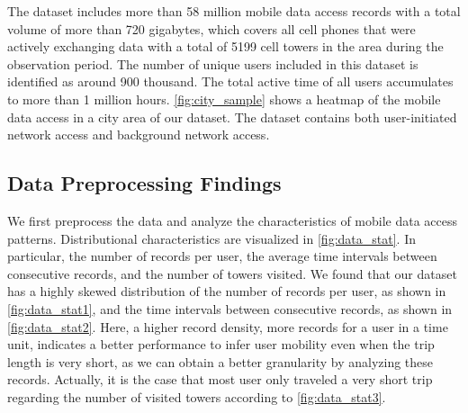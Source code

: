 

The dataset includes more than 58 million mobile data access records with a total volume of more than 720 gigabytes, which covers all cell phones that were actively exchanging data with a total of 5199 cell towers in the area during the observation period.
The number of unique users included in this dataset is identified as around 900 thousand. %
The total active time of all users accumulates to more than 1 million hours.
\autoref{fig:city_sample} shows a heatmap of the mobile data access in a city area of our dataset.
The dataset contains both user-initiated network access and background network access.

\subsection{Data Preprocessing Findings}

We first preprocess the data and analyze the characteristics of mobile data access patterns.  %
Distributional characteristics are visualized in \autoref{fig:data_stat}.
In particular,
the number of records per user,
the average time intervals between consecutive records, and
the number of towers visited.
We found that our dataset has a highly skewed distribution of
the number of records per user, as shown in \autoref{fig:data_stat1}, and
the time intervals between consecutive records, as shown in \autoref{fig:data_stat2}.
Here, a higher record density, \ie more records for a user in a time unit, indicates a better performance to infer user mobility even when the trip length is very short,
as we can obtain a better granularity by analyzing these records.
Actually, it is the case that most user only traveled a very short trip regarding the number of visited towers according to \autoref{fig:data_stat3}.

